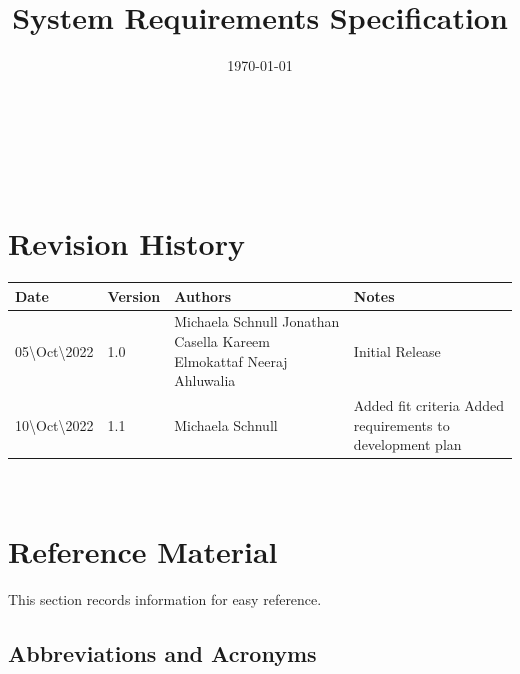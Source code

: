 \documentclass[12pt]{article}
\begin{document}
\title{System Requirements Specification\\
\progname} 
\author{\authname}
\date{\today}
	
\maketitle

~\newpage


\tableofcontents

~\newpage

\section*{Revision History}

\begin{tabularx}{\textwidth}{p{3cm}p{2cm}p{4cm}X}
\toprule {\bf Date} & {\bf Version} & {\bf Authors} & {\bf Notes}\\
\midrule
05\textbackslash Oct\textbackslash 2022 & 1.0 & Michaela Schnull \newline Jonathan Casella \newline Kareem Elmokattaf \newline Neeraj Ahluwalia & Initial Release\\
\hline
10\textbackslash Oct\textbackslash 2022 & 1.1 & Michaela Schnull & Added fit criteria \newline Added requirements to development plan\\
\bottomrule
\end{tabularx}

~\newpage

\section{Reference Material}

This section records information for easy reference.

\subsection{Abbreviations and Acronyms}
\end{document}
